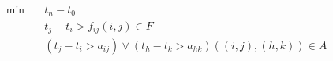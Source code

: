 \begin{align}
  \min\quad & t_{n} - t_{0} \tag{eq\_0001\_a} \\
  & t_{j} - t_{i} > f_{\mathit{ij}} \left(i , j\right) \in F \tag{eq\_0001\_b} \\
  & \left(t_{j} - t_{i} > a_{\mathit{ij}}\right) \vee \left(t_{h} - t_{k} > a_{\mathit{hk}}\right) \left(\left(i , j\right) , \left(h , k\right)\right) \in A \tag{eq\_0001\_c} \\
\end{align}
